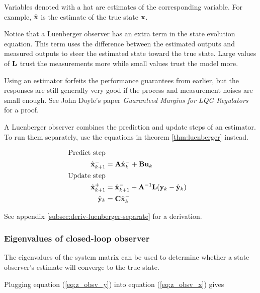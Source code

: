 Variables denoted with a hat are estimates of the corresponding variable. For
example, $\hat{\mathbf{x}}$ is the estimate of the true state $\mathbf{x}$.

Notice that a Luenberger observer has an extra term in the state evolution
equation. This term uses the difference between the estimated outputs and
measured outputs to steer the estimated state toward the true state. Large
values of $\mathbf{L}$ trust the measurements more while small values trust the
model more.

\begin{remark}
  Using an estimator forfeits the performance guarantees from earlier, but the
  responses are still generally very good if the process and measurement noises
  are small enough. See John Doyle's paper \textit{Guaranteed Margins for LQG
  Regulators} for a proof.
\end{remark}

A Luenberger observer combines the prediction and update steps of an estimator.
To run them separately, use the equations in theorem \ref{thm:luenberger}
instead.

\begin{theorem}
  \label{thm:luenberger}

  \begin{align}
    \text{Predict step} \nonumber \\
    \hat{\mathbf{x}}_{k+1}^- &= \mathbf{A}\hat{\mathbf{x}}_k^- + \mathbf{B}\mathbf{u}_k \\
    \text{Update step} \nonumber \\
    \hat{\mathbf{x}}_{k+1}^+ &= \hat{\mathbf{x}}_{k+1}^- + \mathbf{A}^{-1}\mathbf{L}
      (\mathbf{y}_k - \hat{\mathbf{y}}_k) \\
    \hat{\mathbf{y}}_k &= \mathbf{C} \hat{\mathbf{x}}_k^-
  \end{align}
\end{theorem}

See appendix \ref{subsec:deriv-luenberger-separate} for a derivation.

\subsubsection{Eigenvalues of closed-loop observer}

The eigenvalues of the system matrix can be used to determine whether a
\gls{state} observer's estimate will converge to the true \gls{state}.

Plugging equation (\ref{eq:z_obsv_y}) into equation (\ref{eq:z_obsv_x}) gives

